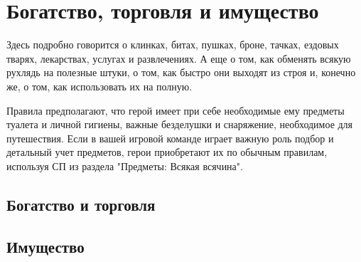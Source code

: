\chapter{Богатство, торговля и имущество}
Здесь подробно говорится о клинках, битах, пушках, броне, тачках, ездовых тварях, лекарствах, услугах и развлечениях. А еще о том, как обменять всякую рухлядь на полезные штуки, о том, как быстро они выходят из строя и, конечно же, о том, как использовать их на полную.
\begin{tcolorbox}
    Правила предполагают, что герой имеет при себе необходимые ему предметы туалета и личной гигиены, важные безделушки и снаряжение, необходимое для путешествия. Если в вашей игровой команде играет важную роль подбор и детальный учет предметов, герои приобретают их по обычным правилам, используя СП из раздела "Предметы: Всякая всячина".
\end{tcolorbox}

\section{Богатство и торговля}

\section{Имущество}



\earlyEnd

\earlyEnd

\earlyEnd

\earlyEnd

\earlyEnd

